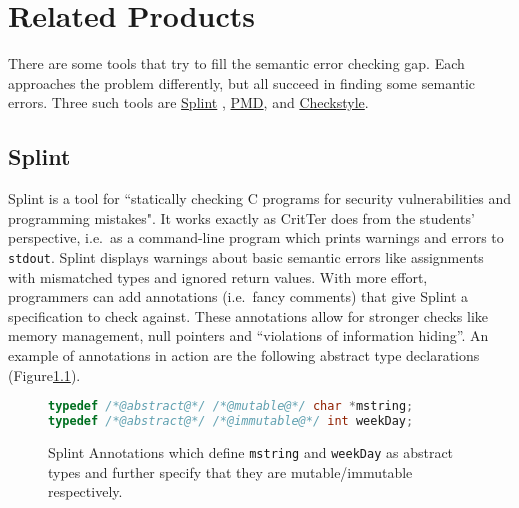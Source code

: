 \documentclass[12pt]{report}
\def\lstlistingname{Figure}
\newcommand{\refCode}{\lstlistingname \hspace{1mm}}
\newcommand{\programName}{CritTer\xspace}
\begin{document}
\chapter{Related Products}

There are some tools that try to fill the semantic error checking gap. Each approaches the 
problem differently, but all succeed in finding some semantic errors. Three such tools are 
\hyperref[sec:splint]{Splint}\cite{splint-manual} , \hyperref[sec:pmdAndCheckstyle]{PMD}\cite{pmd}, and 
\hyperref[sec:pmdAndCheckstyle]{Checkstyle}\cite{checkstyle}.

\section{Splint}
\label{sec:splint}

Splint is a tool for ``statically checking C programs for security vulnerabilities and programming 
mistakes"\cite[p.\ 9]{splint-manual}. It works exactly as \programName does from the students'
perspective, i.e.\ as a command-line program which prints warnings and errors to \lstinline{stdout}. 
Splint displays warnings about basic semantic errors like assignments with mismatched types and 
ignored return values. With more effort, programmers can add annotations (i.e.\ fancy comments) that 
give Splint a specification to check against. These annotations allow for stronger checks like memory 
management, null pointers and ``violations of information hiding''\cite[p. 9]{splint-manual}. An 
example of annotations in action are the following abstract type declarations (\refCode \ref{splint-annotations}).

\begin{figure}[h]
\begin{lstlisting}[frame=single, language=C]
typedef /*@abstract@*/ /*@mutable@*/ char *mstring;
typedef /*@abstract@*/ /*@immutable@*/ int weekDay;
\end{lstlisting}
\caption[Splint Annotations]{Splint Annotations which define \lstinline{mstring} and \lstinline{weekDay} as abstract types and further specify that they are mutable/immutable respectively.} 
\label{splint-annotations}
\end{figure}
\end{document}
